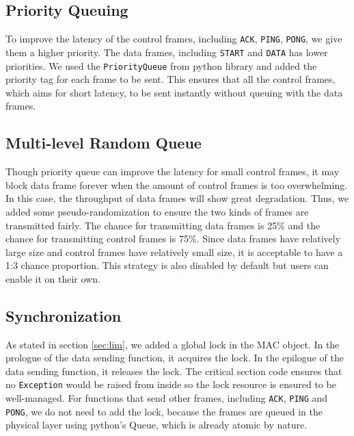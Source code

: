     \subsection{Priority Queuing}
        To improve the latency of the control frames, including {\tt ACK}, {\tt PING}, {\tt PONG}, we give them a higher priority. The data frames, including {\tt START} and {\tt DATA} has lower priorities. We used the {\tt PriorityQueue} from python library and added the priority tag for each frame to be sent. This ensures that all the control frames, which aims for short latency, to be sent instantly without queuing with the data frames.

    \subsection{Multi-level Random Queue}
        Though priority queue can improve the latency for small control frames, it may block data frame forever when the amount of control frames is too overwhelming. In this case, the throughput of data frames will show great degradation. Thus, we added some pseudo-randomization to ensure the two kinds of frames are transmitted fairly. The chance for transmitting data frames is 25\% and the chance for transmitting control frames is 75\%. Since data frames have relatively large size and control frames have relatively small size, it is acceptable to have a 1:3 chance proportion. This strategy is also disabled by default but users can enable it on their own.

    \subsection{Synchronization}
        As stated in section \ref{sec:lim}, we added a global lock in the MAC object. In the prologue of the data sending function, it acquires the lock. In the epilogue of the data sending function, it releases the lock. The critical section code ensures that no {\tt Exception} would be raised from inside so the lock resource is ensured to be well-managed. For functions that send other frames, including {\tt ACK}, {\tt PING} and {\tt PONG}, we do not need to add the lock, because the frames are queued in the physical layer using python's Queue, which is already atomic by nature.

